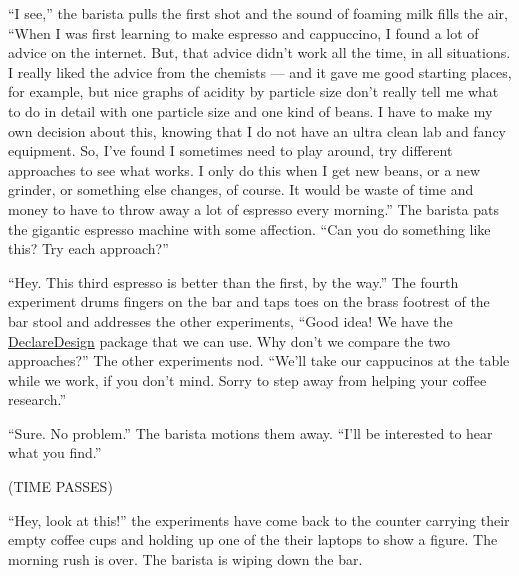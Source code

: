\documentclass[
]{article}
\begin{document}
``I see,'' the barista pulls the first shot and the sound of foaming milk fills the air, ``When I was first learning to make espresso and cappuccino, I found a lot of advice on the internet. But, that advice didn't work all the time, in all situations. I really liked the advice from the chemists --- and it gave me good starting places, for example, but nice graphs of acidity by particle size don't really tell me what to do in detail with one particle size and one kind of beans. I have to make my own decision about this, knowing that I do not have an ultra clean lab and fancy equipment. So, I've found I sometimes need to play around, try different approaches to see what works. I only do this when I get new beans, or a new grinder, or something else changes, of course. It would be waste of time and money to have to throw away a lot of espresso every morning.'' The barista pats the gigantic espresso machine with some affection. ``Can you do something like this? Try each approach?''

``Hey. This third espresso is better than the first, by the way.'' The fourth experiment drums fingers on the bar and taps toes on the brass footrest of the bar stool and addresses the other experiments, ``Good idea! We have the \href{https://declaredesign.org/}{DeclareDesign} package that we can use. Why don't we compare the two approaches?'' The other experiments nod. ``We'll take our cappucinos at the table while we work, if you don't mind. Sorry to step away from helping your coffee research.''

``Sure. No problem.'' The barista motions them away. ``I'll be interested to hear what you find.''

(TIME PASSES)

``Hey, look at this!'' the experiments have come back to the counter carrying their empty coffee cups and holding up one of the their laptops to show a figure. The morning rush is over. The barista is wiping down the bar.
\end{document}
